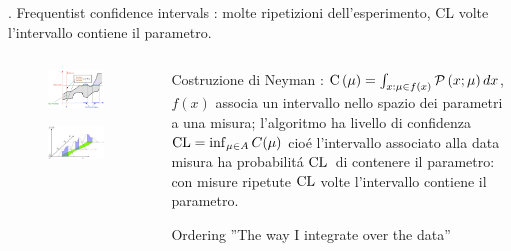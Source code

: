 \documentclass[asd-beamer.tex]{subfiles}
\begin{document}
\begin{frame}{. Frequentist confidence intervals}
: molte ripetizioni dell'esperimento, CL volte l'intervallo contiene il parametro.
\begin{columns}[T]
\begin{column}{0.4\textwidth}
	\begin{figure}
		\centering
		\includegraphics[width=0.9\textwidth,keepaspectratio]{figures/interval/clband}
		\label{fig:clband}
	\end{figure}
	\begin{figure}
		\centering
		\includegraphics[width=0.9\textwidth,keepaspectratio]{figures/interval/neyman}
		\label{fig:neyman}
	\end{figure}
\end{column}
\begin{column}{0.6\textwidth}
	\begin{block}{Costruzione di Neyman}
		: $\operatorname{C}{(\mu)}=\int_{x:\mu\in f(x)}\operatorname{\mathcal{P}}{(x;\mu)}\,dx$, $f(x)$ associa un intervallo nello spazio dei parametri a una misura; l'algoritmo ha livello di confidenza $\operatorname{CL}=\inf_{\mu\in A}C(\mu)$ cio\'e l'intervallo associato alla data misura ha probabilit\'a $\operatorname{CL}{}$ di contenere il parametro: con misure ripetute $\operatorname{CL}$ volte l'intervallo contiene il parametro.
	\end{block}
	\begin{block}{Ordering}
		''The way I integrate over the data''
	\end{block}
\end{column}
\end{columns}
\end{frame}
\end{document}
